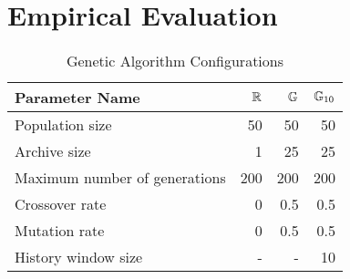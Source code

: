 \section{Empirical Evaluation}
\label{sec.evaluation}

\begin{table}[!t]
  \caption{Genetic Algorithm Configurations}
  \label{tbl.gen.config}
  \scriptsize
  \centering
  \begin{tabular}{l|r|r|r}
    \toprule
    \textbf{Parameter Name} &$\mathbb{R}$&$\mathbb{G}$ &$\mathbb{G}_{10}$ \\
    \hline
    Population size                   & 50  & 50  & 50  \\
    Archive size                      & 1   & 25  & 25  \\
    Maximum number of generations     & 200 & 200 & 200 \\
    Crossover rate                    & 0   & 0.5 & 0.5 \\
    Mutation rate                     & 0   & 0.5 & 0.5 \\
    History window size               & -   & -   & 10  \\
    \bottomrule
  \end{tabular}
\end{table}


